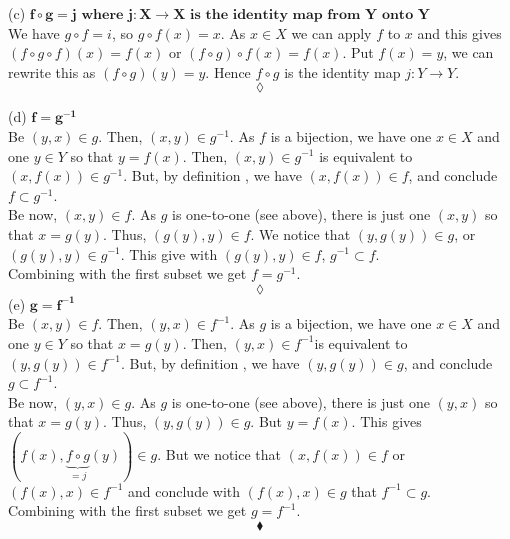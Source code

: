 (c) $\mathbf{f\circ g = j \text{ where } j:X\rightarrow X \text{ is the identity map from } Y \text{ onto }Y}$\\
We have $g\circ f=i$, so $g\circ f(x)=x$. As $x\in X$ we can apply $f$ to $x$ and this gives $(f\circ g\circ f)(x)=f(x)$ or $(f\circ g)\circ f(x)=f(x)$. Put $f(x)=y$, we can rewrite this as $(f\circ g)(y)=y$. Hence $f\circ g$ is the identity map $j:Y\rightarrow Y$.
$$\lozenge$$


(d) $\mathbf{f=g^{-1}}$\\
Be $(y,x)\in g$. Then, $(x,y)\in g^{-1}$. As $f$ is a bijection, we have one $x\in X$ and one $y\in Y$ so that $y= f(x)$. Then, $(x,y)\in g^{-1}$ is equivalent to $(x,f(x))\in g^{-1}$. But, by definition , we have  $(x,f(x))\in f$, and conclude $f\subset g^{-1}$. \\
Be now, $(x,y)\in f$. As $g$ is one-to-one (see above), there is just one $(x,y)$ so that $x=g(y)$. Thus, $(g(y),y)\in f$. We notice that $(y, g(y))\in g$, or $(g(y),y )\in g^{-1}$. This give with $(g(y),y)\in f$, $g^{-1}\subset f$.\\
Combining with the first subset we get $f=g^{-1}$.
$$\lozenge$$
(e) $\mathbf{g=f^{-1}}$\\
Be $(x,y)\in f$. Then, $(y,x)\in f^{-1}$. As $g$ is a bijection, we have one $x\in X$ and one $y\in Y$ so that $x= g(y)$. Then, $(y,x)\in f^{-1}$is equivalent to $(y,g(y))\in f^{-1}$. But, by definition , we have  $(y,g(y))\in g$, and conclude $g\subset f^{-1}$. \\
Be now, $(y,x)\in g$. As $g$ is one-to-one (see above), there is just one $(y,x)$ so that $x=g(y)$. Thus, $(y,g(y))\in g$. But $y=f(x)$.  This gives  $(f(x),\underbrace {f\circ g}_{=j}(y))\in g$. But we notice that $(x,f(x))\in f $ or  $(f(x),x)\in f^{-1} $ and conclude with $(f(x),x)\in g$ that  $f^{-1}\subset g$.\\
Combining with the first subset we get $g=f^{-1}$.
$$\blacklozenge$$
